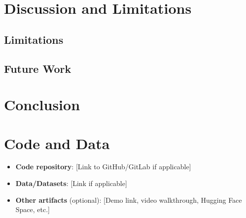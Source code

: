 \documentclass[10pt]{article}
\newif\ifshowguidance
\newcommand{\guidance}[1]{\ifshowguidance{#1\par}\fi}
\begin{document}
\section{Discussion and Limitations}

\guidance{Discuss the broader implications for AI safety.
What do your results mean? What trends do you notice and what might they indicate?}

\subsection{Limitations}

\guidance{What are the limitations of your work? What threat models or failure modes did you
not address? Be honest about constraints --- methodological limitations, scope limitations, or
aspects you couldn't fully address in the hackathon timeframe. Explicitly note the assumptions
you made, whether implicitly or explicitly, and how the interpretation of your results would
change if a given assumption did not hold.}

\subsection{Future Work}

\guidance{What are the natural next steps? How could this work be extended?}

\section{Conclusion}

\guidance{Briefly summarize your main findings and their implications (1--2 paragraphs).}

\section*{Code and Data}

\guidance{Include links if applicable. If your project doesn't involve code (e.g., policy
analysis) or if there are info-hazard considerations, note that here.}

\begin{itemize}
  \item \textbf{Code repository}: [Link to GitHub/GitLab if applicable]
  \item \textbf{Data/Datasets}: [Link if applicable]
  \item \textbf{Other artifacts} (optional): [Demo link, video walkthrough, Hugging Face Space, etc.]
\end{itemize}
\end{document}
